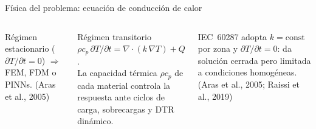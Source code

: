 \documentclass[aspectratio=169]{beamer}
\newcommand{\refcite}[1]{{\footnotesize\color{gray!70!black} #1}}
\begin{document}
\begin{frame}{Física del problema: ecuación de conducción de calor}
\begin{columns}[T]
\begin{block}{\scriptsize Régimen estacionario ($\partial T/\partial t=0$)}
$\Rightarrow$ FEM, FDM o PINNs.
\refcite{(Aras et al., 2005)}
\end{block}
\vspace{0.15em}
\begin{block}{\scriptsize Régimen transitorio}
\scriptsize
$\rho c_p\,\partial T/\partial t = \nabla\cdot(k\,\nabla T)+Q$.\\[3pt]
La capacidad térmica $\rho c_p$ de cada material controla la
respuesta ante ciclos de carga, sobrecargas y DTR dinámico.
\end{block}
\vspace{0.15em}
\begin{exampleblock}{}\centering\scriptsize
IEC~60287 adopta $k=\text{const}$ por zona y $\partial T/\partial t=0$:
da solución cerrada pero limitada a condiciones homogéneas.
\refcite{(Aras et al., 2005; Raissi et al., 2019)}
\end{exampleblock}
\end{columns}
\end{frame}
\end{document}
